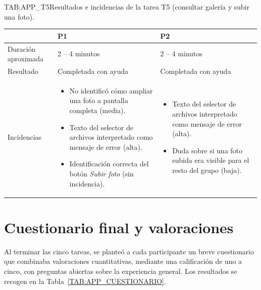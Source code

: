 \begin{table}[Incidencias T5]{TAB:APP_T5}{Resultados e
incidencias de la tarea T5 (consultar galería y subir una foto).}
\begin{center}
\begin{tabular}{p{3.5cm}p{4.5cm}p{4.5cm}}
\toprule
& \textbf{P1} & \textbf{P2} \\
\midrule
Duración aproximada    & 2 -- 4 minutos & 2 -- 4 minutos \\
Resultado              & Completada con ayuda & Completada con ayuda \\
\midrule
Incidencias &
\begin{itemize}\setlength\itemsep{0pt}\setlength\parsep{0pt}
\item No identificó cómo ampliar una foto a pantalla completa (media).
\item Texto del selector de archivos interpretado como mensaje de error (alta).
\item Identificación correcta del botón \emph{Subir foto} (sin incidencia).
\end{itemize}
&
\begin{itemize}\setlength\itemsep{0pt}\setlength\parsep{0pt}
\item Texto del selector de archivos interpretado como mensaje de error (alta).
\item Duda sobre si una foto subida era visible para el resto del grupo (baja).
\end{itemize}\\
\bottomrule
\end{tabular}
\end{center}
\end{table}
\FloatBarrier


\section{Cuestionario final y
valoraciones\label{SEC:APP_CUESTIONARIO}}

Al terminar las cinco tareas, se planteó a cada participante un breve
cuestionario que combinaba valoraciones cuantitativas, mediante una calificación de uno a cinco, con preguntas abiertas sobre la experiencia general.
Los resultados se recogen en la Tabla~\ref{TAB:APP_CUESTIONARIO}.

